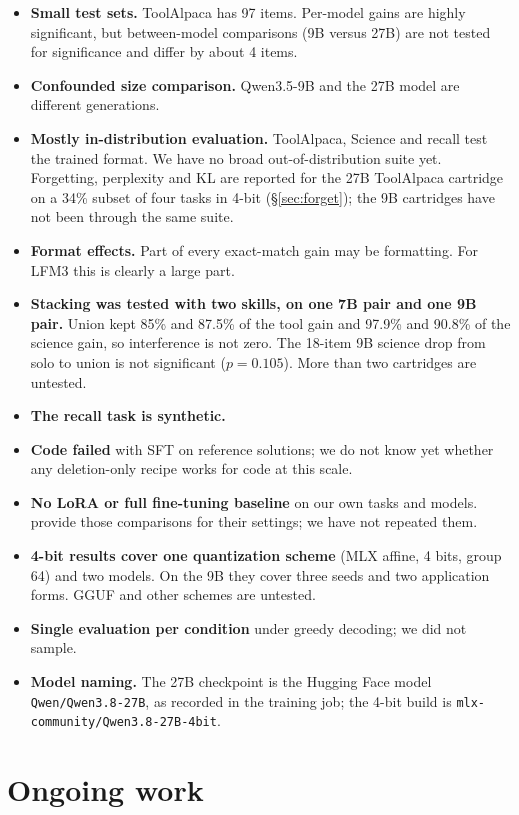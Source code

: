 \documentclass[11pt]{article}
\begin{document}
\begin{itemize}
\item \textbf{Small test sets.} ToolAlpaca has 97 items. Per-model gains are highly significant, but between-model comparisons (9B versus 27B) are not tested for significance and differ by about 4 items.
\item \textbf{Confounded size comparison.} Qwen3.5-9B and the 27B model are different generations.
\item \textbf{Mostly in-distribution evaluation.} ToolAlpaca, Science and recall test the trained format. We have no broad out-of-distribution suite yet. Forgetting, perplexity and KL are reported for the 27B ToolAlpaca cartridge on a 34\% subset of four tasks in 4-bit (\S\ref{sec:forget}); the 9B cartridges have not been through the same suite.
\item \textbf{Format effects.} Part of every exact-match gain may be formatting. For LFM3 this is clearly a large part.
\item \textbf{Stacking was tested with two skills, on one 7B pair and one 9B pair.} Union kept 85\% and 87.5\% of the tool gain and 97.9\% and 90.8\% of the science gain, so interference is not zero. The 18-item 9B science drop from solo to union is not significant ($p = 0.105$). More than two cartridges are untested.
\item \textbf{The recall task is synthetic.}
\item \textbf{Code failed} with SFT on reference solutions; we do not know yet whether any deletion-only recipe works for code at this scale.
\item \textbf{No LoRA or full fine-tuning baseline} on our own tasks and models. \citep{lu2026deleting} provide those comparisons for their settings; we have not repeated them.
\item \textbf{4-bit results cover one quantization scheme} (MLX affine, 4 bits, group 64) and two models. On the 9B they cover three seeds and two application forms. GGUF and other schemes are untested.
\item \textbf{Single evaluation per condition} under greedy decoding; we did not sample.
\item \textbf{Model naming.} The 27B checkpoint is the Hugging Face model \texttt{Qwen/Qwen3.8-27B}, as recorded in the training job; the 4-bit build is \texttt{mlx-community/Qwen3.8-27B-4bit}.
\end{itemize}

\section{Ongoing work}
\label{sec:pending}
\end{document}
